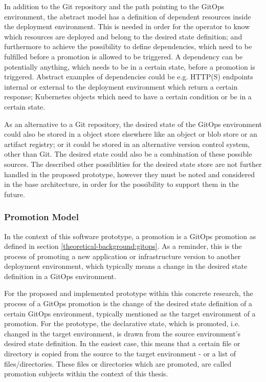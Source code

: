 In addition to the Git repository and the path pointing to the GitOps environment,
the abstract model has a definition of dependent resources inside the deployment environment.
This is needed in order for the operator to know which resources are deployed and belong to the desired state definition;
and furthermore to achieve the possibility to define dependencies,
which need to be fulfilled before a promotion is allowed to be triggered.
A dependency can be potentially anything, which needs to be in a certain state, before a promotion is triggered.
Abstract examples of dependencies could be e.g.
HTTP(S) endpoints internal or external to the deployment environment which return a certain response;
Kubernetes objects which need to have a certain condition or be in a certain state.

As an alternative to a Git repository,
the desired state of the GitOps environment could also be stored in a object store elsewhere
like an object or blob store or an artifact registry;
or it could be stored in an alternative version control system, other than Git.
The desired state could also be a combination of these possible sources.
The described other possiblities for the desired state store are not further handled in the proposed prototype,
however they must be noted and considered in the base architecture, in order for the possibility to support
them in the future.

\subsubsection*{Promotion Model}

In the context of this software prototype,
a promotion is a GitOps promotion as defined in section
\ref{theoretical-background:gitops}.
As a reminder, this is the process of promoting a new application or infrastructure version
to another deployment environment, which typically means a change in the desired state definition in a GitOps environment.

For the proposed and implemented prototype within this concrete research,
the process of a GitOps promotion is the change of the desired state definition of a certain GitOps environment,
typically mentioned as the target environment of a promotion. For the prototype,
the declarative state, which is promoted, i.e. changed in the target environment, is drawn from the
source environment's desired state definition. In the easiest case, this means that a certain
file or directory is copied from the source to the target environment - or a list of files/directories.
These files or directories which are promoted, are called promotion subjects within the context of this
thesis.

